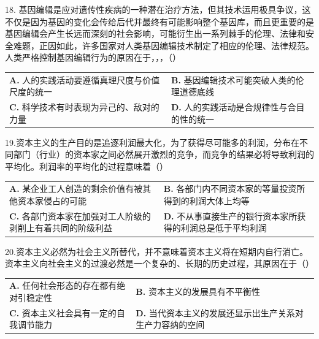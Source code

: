 \documentclass[UTF8,11pt]{ctexart}
\begin{document}
18. 基因编辑是应对遗传性疾病的一种潜在治疗方法，但其技术运用极具争议，这不仅是因为基因的变化会传给后代并最终有可能影响整个基因库，而且更重要的是基因编辑会产生长远而深刻的社会影响，可能衍生出一系列棘手的伦理、法律和安全难题，正因如此，许多国家对人类基因编辑技术制定了相应的伦理、法律规范。人类严格控制基因编辑行为的原因在于，，，（）


\begin{center}\begin{tabular}{>{\raggedright\arraybackslash}p{\dimexpr(\linewidth-4\tabcolsep)/2\relax}>{\raggedright\arraybackslash}p{\dimexpr(\linewidth-4\tabcolsep)/2\relax}}
\textbf{A.} 人的实践活动要遵循真理尺度与价值尺度的统一 & \textbf{B.} 基因编辑技术可能突破人类的伦理道德底线\\[.35em]
\textbf{C.} 科学技术有时表现为异己的、敌对的力量 & \textbf{D.} 人的实践活动是合规律性与合目的性的统一\\[.35em]\end{tabular}\end{center}

19.资本主义的生产目的是追逐利润最大化，为了获得尽可能多的利润，分布在不同部门（行业）的资本家之间必然展开激烈的竞争，而竞争的结果必将导致利润的平均化。利润率的平均化的过程意味着（）


\begin{center}\begin{tabular}{>{\raggedright\arraybackslash}p{\dimexpr(\linewidth-4\tabcolsep)/2\relax}>{\raggedright\arraybackslash}p{\dimexpr(\linewidth-4\tabcolsep)/2\relax}}
\textbf{A.} 某企业工人创造的剩余价值有被其他资本家侵占的可能 & \textbf{B.} 各部门内不同资本家的等量投资所得到的利润大体上均等\\[.35em]
\textbf{C.} 各部门资本家在加强对工人阶级的剥削上有着共同的阶级利益 & \textbf{D.} 不从事直接生产的银行资本家所获得的利润总是低于平均利润\\[.35em]\end{tabular}\end{center}

20.资本主义必然为社会主义所替代，并不意味着资本主义将在短期内自行消亡。资本主义向社会主义的过渡必然是一个复杂的、长期的历史过程，其原因在于（）


\begin{center}\begin{tabular}{>{\raggedright\arraybackslash}p{\dimexpr(\linewidth-4\tabcolsep)/2\relax}>{\raggedright\arraybackslash}p{\dimexpr(\linewidth-4\tabcolsep)/2\relax}}
\textbf{A.} 任何社会形态的存在都有绝对引稳定性 & \textbf{B.} 资本主义的发展具有不平衡性\\[.35em]
\textbf{C.} 资本主义社会具有一定的自我调节能力 & \textbf{D.} 当代资本主义的发展还显示出生产关系对生产力容纳的空间\\[.35em]\end{tabular}\end{center}
\end{document}
